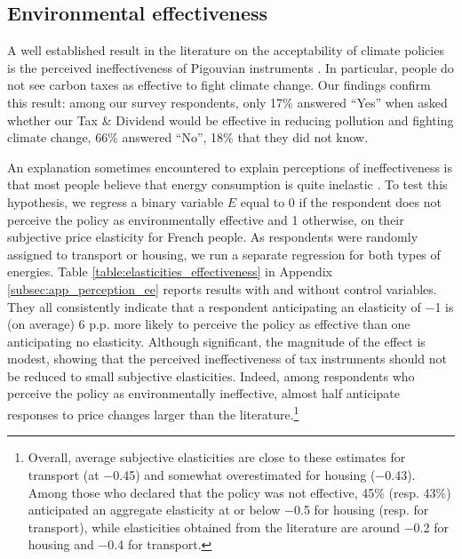 \documentclass[11pt]{article}
\begin{document}
    \subsection{Environmental effectiveness}

A well established result in the literature on the acceptability of climate policies is the perceived ineffectiveness of Pigouvian instruments \citep[e.g.][]{dresner_social_2006,kallbekken_et_al_2011, baranzini_effectiveness_2017}. In particular, people do not see carbon taxes as effective to fight climate change. Our findings confirm this result: among our survey respondents, only 17\% answered ``Yes'' when asked whether our Tax \& Dividend would be effective in reducing pollution and fighting climate change, 66\% answered ``No'', 18\% that they did not know.

An explanation sometimes encountered to explain perceptions of ineffectiveness is that most people believe that energy consumption is quite inelastic \citep{kallbekken_saelen_2011,carattini_overcoming_2018}. To test this hypothesis, we regress a binary variable $E$ equal to 0 if the respondent does not perceive the policy as environmentally effective and 1 otherwise, on their subjective price elasticity for French people. As respondents were randomly assigned to transport or housing, we run a separate regression for both types of energies. Table \ref{table:elasticities_effectiveness} in Appendix \ref{subsec:app_perception_ee} reports results with and without control variables. They all consistently indicate that a respondent anticipating an elasticity of $-$1 is (on average) 6 p.p. more likely to perceive the policy as effective than one anticipating no elasticity. Although significant, the magnitude of the effect is modest, showing that the perceived ineffectiveness of tax instruments should not be reduced to small subjective elasticities. Indeed, among respondents who perceive the policy as environmentally ineffective, almost half anticipate responses to price changes larger than the literature.\footnote{Overall, average subjective elasticities are close to these estimates for transport (at $-$0.45) and somewhat overestimated for housing ($-$0.43). Among those who declared that the policy was not effective, 45\% (resp. 43\%) anticipated an aggregate elasticity at or below $-$0.5 for housing (resp. for transport), while elasticities obtained from the literature are around $-$0.2 for housing and $-$0.4 for transport.\label{fnel}}
\end{document}
